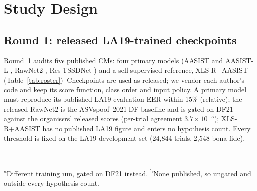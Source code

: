 \documentclass[journal]{IEEEtran}
\newcommand{\tauE}{\tau^{*}_{\mathrm{EER}}}
\begin{document}
\section{Study Design}
\label{sec:design}
\subsection{Round 1: released LA19-trained checkpoints}
Round~1 audits five published CMs: four primary models (AASIST and AASIST-L \cite{jung22_aasist}, RawNet2
\cite{tak21_rawnet2}, Res-TSSDNet \cite{hua21_res_tssdnet}) and a self-supervised reference, XLS-R+AASIST
\cite{tak22_xlsr_aasist} (Table~\ref{tab:roster}). Checkpoints are used as released; we vendor each author's code and keep
its score function, class order and input policy. A primary model must reproduce its published LA19 evaluation EER within
15\% (relative); the released RawNet2 is the ASVspoof~2021 DF baseline and is gated on DF21 against the organisers'
released scores (per-trial agreement \(3.7{\times}10^{-5}\)); XLS-R+AASIST has no published LA19 figure and enters no
hypothesis count. Every threshold is fixed on the LA19 development set (24,844 trials, 2,548 bona fide).

\begin{table}[!t]
\caption{Round-1 roster and development thresholds. EER on LA19 eval (\%): ours / published. Dev EER (\%) and \(\tauE\) on
LA19 dev. Last column: dev bona fide trials below, and dev spoof trials at or above, \(\tauE\).}
\label{tab:roster}
\centering
\footnotesize
\setlength{\tabcolsep}{3pt}
\\[2pt]
\parbox{\columnwidth}{\footnotesize\textsuperscript{a}Different training run, gated on DF21 instead.
\textsuperscript{b}None published, so ungated and outside every hypothesis count.}
\end{table}
\end{document}
